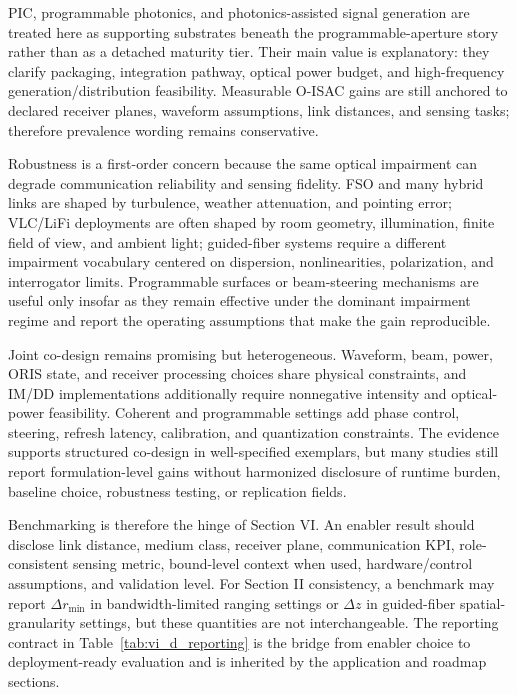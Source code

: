 \documentclass[letterpaper,journal]{IEEEtran}
\begin{document}
PIC, programmable photonics, and photonics-assisted signal generation are treated here as supporting substrates beneath the programmable-aperture story rather than as a detached maturity tier. Their main value is explanatory: they clarify packaging, integration pathway, optical power budget, and high-frequency generation/distribution feasibility. Measurable O-ISAC gains are still anchored to declared receiver planes, waveform assumptions, link distances, and sensing tasks; therefore prevalence wording remains conservative.

Robustness is a first-order concern because the same optical impairment can degrade communication reliability and sensing fidelity. FSO and many hybrid links are shaped by turbulence, weather attenuation, and pointing error; VLC/LiFi deployments are often shaped by room geometry, illumination, finite field of view, and ambient light; guided-fiber systems require a different impairment vocabulary centered on dispersion, nonlinearities, polarization, and interrogator limits. Programmable surfaces or beam-steering mechanisms are useful only insofar as they remain effective under the dominant impairment regime and report the operating assumptions that make the gain reproducible.

Joint co-design remains promising but heterogeneous. Waveform, beam, power, ORIS state, and receiver processing choices share physical constraints, and IM/DD implementations additionally require nonnegative intensity and optical-power feasibility. Coherent and programmable settings add phase control, steering, refresh latency, calibration, and quantization constraints. The evidence supports structured co-design in well-specified exemplars, but many studies still report formulation-level gains without harmonized disclosure of runtime burden, baseline choice, robustness testing, or replication fields.

Benchmarking is therefore the hinge of Section VI. An enabler result should disclose link distance, medium class, receiver plane, communication KPI, role-consistent sensing metric, bound-level context when used, hardware/control assumptions, and validation level. For Section II consistency, a benchmark may report \(\Delta r_{\min}\) in bandwidth-limited ranging settings or \(\Delta z\) in guided-fiber spatial-granularity settings, but these quantities are not interchangeable. The reporting contract in Table~\ref{tab:vi_d_reporting} is the bridge from enabler choice to deployment-ready evaluation and is inherited by the application and roadmap sections.
\end{document}
